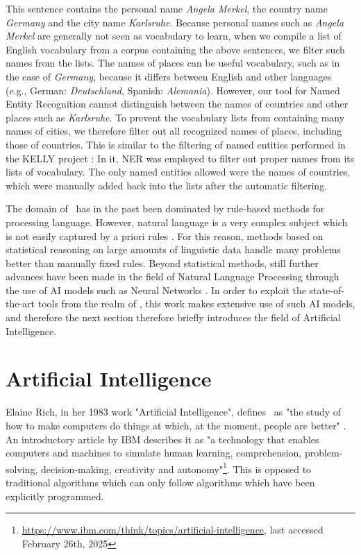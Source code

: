 This sentence contains the personal name \textit{Angela Merkel}, the country name \textit{Germany} and the city name \textit{Karlsruhe}.
Because personal names such as \textit{Angela Merkel} are generally not seen as vocabulary to learn, when we compile a list of English vocabulary from a corpus containing the above sentences, we filter such names from the lists.
The names of places can be useful vocabulary, such as in the case of \textit{Germany}, because it differs between English and other languages (e.g., German: \textit{Deutschland}, Spanish: \textit{Alemania}).
However, our tool for Named Entity Recognition cannot distinguish between the names of countries and other places such as \textit{Karlsruhe}.
To prevent the vocabulary lists from containing many names of cities, we therefore filter out all recognized names of places, including those of countries.
This is similar to the filtering of named entities performed in the KELLY project \cite{kokkinakisCorpusbasedApproachesCreation2011}:
In it, NER was employed to filter out proper names from its lists of vocabulary.
The only named entities allowed were the names of countries, which were manually added back into the lists after the automatic filtering.


The domain of \NLP\ has in the past been dominated by rule-based methods for processing language.
However, natural language is a very complex subject which is not easily captured by a priori rules \cite{jurafskySpeechLanguageProcessing2025a}.
For this reason, methods based on statistical reasoning on large amounts of linguistic data handle many problems better than manually fixed rules.
Beyond statistical methods, still further advances have been made in the field of Natural Language Processing through the use of AI models such as Neural Networks \cite{jurafskySpeechLanguageProcessing2025a}.
In order to exploit the state-of-the-art tools from the realm of \NLP, this work makes extensive use of such AI models, and therefore the next section therefore briefly introduces the field of Artificial Intelligence.

\section{Artificial Intelligence}
Elaine Rich, in her 1983 work "Artificial Intelligence", defines \AI\ as "the study of how to make computers do things at which, at the moment, people are better" \cite{rich1983artificial}.
An introductory article by IBM describes it as "a technology that enables computers and machines to simulate human learning, comprehension, problem-solving, decision-making, creativity and autonomy"\footnote{\url{https://www.ibm.com/think/topics/artificial-intelligence}, last accessed February 26th, 2025}.
This is opposed to traditional algorithms which can only follow algorithms which have been explicitly programmed.

